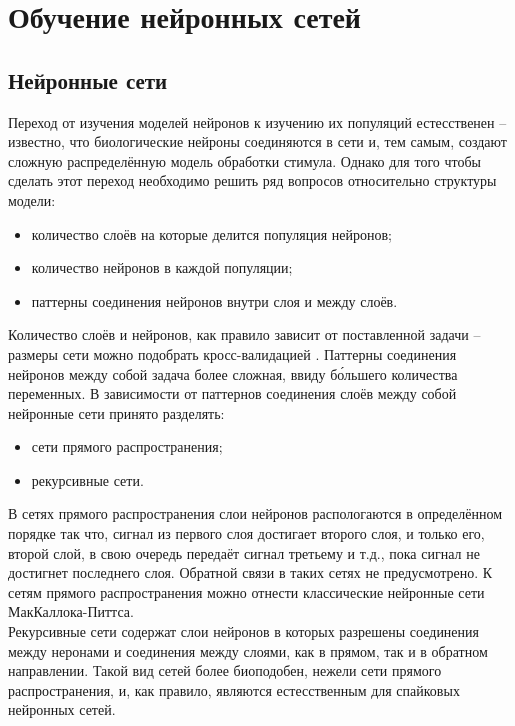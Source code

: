\documentclass[a4paper,10pt]{article}
\begin{document}
\section{Обучение нейронных сетей}
\subsection{Нейронные сети}
\indent Переход от изучения моделей нейронов к изучению их популяций естесственен -- известно, что биологические нейроны соединяются в сети и, тем самым, создают сложную распределённую модель обработки стимула. Однако для того чтобы сделать этот переход необходимо решить ряд вопросов относительно структуры модели:
\begin{itemize}
\item количество слоёв на которые делится популяция нейронов;
\item количество нейронов в каждой популяции;
\item паттерны соединения нейронов внутри слоя и между слоёв.
\end{itemize}
\indent Количество слоёв и нейронов, как правило зависит от поставленной задачи -- размеры сети можно подобрать кросс-валидацией \cite{krogh1995neural}. Паттерны соединения нейронов между собой задача более сложная, ввиду б\'{о}льшего количества переменных. В зависимости от паттернов соединения слоёв между собой нейронные сети принято разделять:
\begin{itemize}
\item сети прямого распространения;
\item рекурсивные сети.
\end{itemize}
\indent В сетях прямого распространения слои нейронов распологаются в определённом порядке так что, сигнал из первого слоя достигает второго слоя, и только его, второй слой, в свою очередь передаёт сигнал третьему и т.д., пока сигнал не достигнет последнего слоя. Обратной связи в таких сетях не предусмотрено. К сетям прямого распространения можно отнести классические нейронные сети МакКаллока-Питтса.\\
\indent Рекурсивные сети содержат слои нейронов в которых разрешены соединения между неронами и соединения между слоями, как в прямом, так и в обратном направлении. Такой вид сетей более биоподобен, нежели сети прямого распространения, и, как правило, являются естесственным для спайковых нейронных сетей.\\
\end{document}
